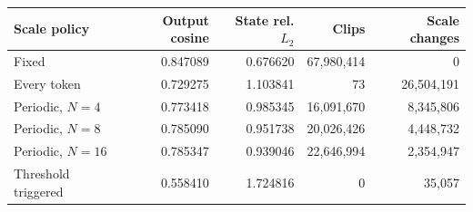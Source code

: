 \begin{tabular}{lrrrr}
\toprule
Scale policy & Output cosine & State rel. $L_2$ & Clips & Scale changes \\
\midrule
Fixed & 0.847089 & 0.676620 & 67{,}980{,}414 & 0 \\
Every token & 0.729275 & 1.103841 & 73 & 26{,}504{,}191 \\
Periodic, $N=4$ & 0.773418 & 0.985345 & 16{,}091{,}670 & 8{,}345{,}806 \\
Periodic, $N=8$ & 0.785090 & 0.951738 & 20{,}026{,}426 & 4{,}448{,}732 \\
Periodic, $N=16$ & 0.785347 & 0.939046 & 22{,}646{,}994 & 2{,}354{,}947 \\
Threshold triggered & 0.558410 & 1.724816 & 0 & 35{,}057 \\
\bottomrule
\end{tabular}
